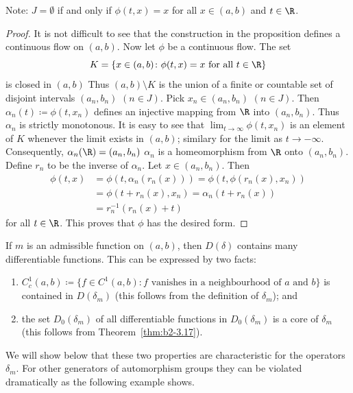 Note: $J = \emptyset$ if and only if\/ $\phi(t,x) = x$ for all $x \in (a,b)$ and $t \in \R$.
\begin{proof}
It is not difficult to see that the construction in the proposition defines a continuous flow on $(a,b)$.
Now let $\phi$ be a continuous flow.
The set 
\[
K = \{ x \in (a,b) \colon \phi(t,x) = x \text{ for all } t \in \R \} 
\]
is closed in $(a,b)$
Thus $(a,b) \setminus K$ is the union of a finite or countable set of disjoint intervals $(a_{n},b_{n})$ $(n \in J)$.
Pick $x_{n} \in (a_{n},b_{n})$ $(n \in J)$.
Then $\alpha_{n}(t) \coloneqq \phi(t,x_{n})$ defines an injective mapping from $\R$ into $(a_{n},b_{n})$.
Thus $\alpha_{n}$ is strictly monotonous.
It is easy to see that $\lim_{t \to \infty} \phi(t,x_{n})$ is an element of\/ $K$ whenever the limit exists in $(a,b)$; similary for the limit as $t \to -\infty$.
Consequently, $\alpha_{n}(\R) = (a_{n},b_{n})$ \ie  $\alpha_{n}$ is a homeomorphism from $\R$ onto $(a_{n},b_{n})$.
Define $r_{n}$ to be the inverse of\/ $\alpha_{n}$.
Let $x \in (a_{n},b_{n})$.
Then 
\begin{align*}
\phi(t,x) &= \phi(t, \alpha_{n}(r_{n}(x))) = \phi(t, \phi(r_{n}(x),x_{n})) \\
          &= \phi(t + r_{n}(x),x_{n}) = \alpha_{n}(t + r_{n}(x)) \\
          &= r_{n}^{-1}(r_{n}(x) + t)	
\end{align*}
for all $t \in \R$.
This proves that $\phi$ has the desired form.
\end{proof}
If\/ $m$ is an admissible function on $(a,b)$, then $D(\delta)$ contains many differentiable functions.
This can be expressed by two facts:
\begin{enumerate}[\upshape (i)]
\item \label{enum:b2-3-1.1}
$C_{c}^{1}(a,b) \coloneqq \{ f \in C^{1}(a,b) \colon f \text{ vanishes in a neighbourhood of } a \text{ and } b\}$ is contained in $D(\delta_{m})$ (this follows from the definition of\/ $\delta_{m}$); and
\item  \label{enum:b2-3-1.2}
the set $D_{0}(\delta_{m})$ of all differentiable functions in $D_{0}(\delta_{m})$ is a core of\/ $\delta_{m}$ (this follows from Theorem~\ref{thm:b2-3.17}).
\end{enumerate}
We will show below that these two properties are characteristic for the operators $\delta_{m}$.
For other generators of automorphism groups they can be violated dramatically as the following example shows.
